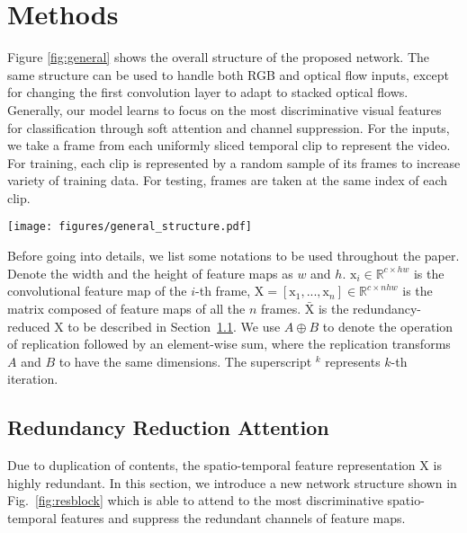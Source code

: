 \documentclass[runningheads]{llncs}
\def\x{\boldsymbol{\mathrm{x}}}
\def\X{\boldsymbol{\mathrm{X}}}
\def\Re{\mathbb{R}}
\begin{document}
 \section{Methods}
Figure \ref{fig:general} shows the overall structure of the proposed network. The same structure can be used to handle both RGB and optical flow inputs, except for changing the first convolution layer to adapt to stacked optical flows. Generally, our model learns to focus on the most discriminative visual features for classification through soft attention and channel suppression. For the inputs, we take a frame from each uniformly sliced temporal clip to represent the video. For training, each clip is represented by a random sample of its frames to increase variety of training data. For testing, frames are taken at the same index of each clip.
\begin{figure*}[htbp]
\centering
\texttt{[image: figures/general\_structure.pdf]}
\caption{The general structure of the proposed model. Input sequences are divided into clips of the same length. One frame or flow stack is sampled from each clip. The CNNs extract feature maps from the sampled frames, then the RRA modules iteratively updates the feature maps. Each summary feature vector gives one classification score via the classifiers, and the scores are averaged as the final prediction. }
\label{fig:general}
\end{figure*}
Before going into details, we list some notations to be used throughout the paper. Denote the width and the height of feature maps as $w$ and $h$. $\x_i\in \Re^{c\times hw}$ is the convolutional feature map of the $i$-th frame, $\X=[\x_1,...,\x_n]\in \Re^{c\times nhw}$ is the matrix composed of feature maps of all the $n$ frames. $\bar{\X}$ is the redundancy-reduced $\X$ to be described in Section~\ref{sec:rra}. We use $A \oplus B$ to denote the operation of replication followed by an element-wise sum, where the replication transforms $A$ and $B$ to have the same dimensions. The superscript $^{k}$ represents $k$-th iteration.




\subsection{Redundancy Reduction Attention}\label{sec:rra}
Due to duplication of contents, the spatio-temporal feature representation $\X$ is highly redundant. In this section, we introduce a new network structure shown in Fig.~\ref{fig:resblock} which is able to attend to the most discriminative spatio-temporal features and suppress the redundant channels of feature maps.
\end{document}
